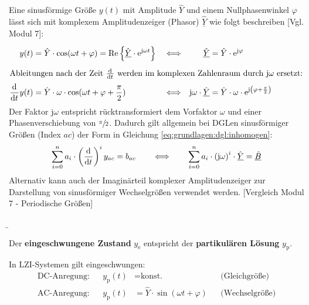 \begin{frame}
{    Eine sinusförmige Größe $y(t)$ mit Amplitude $\hat{Y}$ und einem Nullphasenwinkel $\varphi$ lässt sich mit komplexem Amplitudenzeiger (Phasor) $\underline{\hat{Y}}$ 
    wie folgt beschreiben [Vgl. Modul 7]:
    \begin{align*}
        y(t) &= \hat{Y} \cdot \cos(\omega t + \varphi) = \operatorname{Re}\left\{ \underline{\hat{Y}} \cdot \mathrm{e}^{\mathrm{j} \omega t} \right\} &
            &\Longleftrightarrow& 
            \underline{\hat{Y}} &= \hat{Y} \cdot \mathrm{e}^{\mathrm{j} \varphi} 
            \vphantom{\bigg|}\\
    \intertext{Ableitungen nach der Zeit $\frac{\mathrm{d}^{{}}}{\mathrm{d}t^{{}}}$ werden im komplexen Zahlenraum durch $\mathrm{j} \omega$ ersetzt:}
        \frac{\mathrm{d}^{{}}}{\mathrm{d}t^{{}}} y(t) &= \hat{Y} \cdot \omega \cdot \cos(\omega t + \varphi + \frac{\pi}{2}) &
            &\Longleftrightarrow& 
            \mathrm{j} \omega \cdot  \underline{\hat{Y}} &= \hat{Y} \cdot \omega \cdot \mathrm{e}^{\mathrm{j} \left(\varphi + \frac{\pi}{2}\right)}
    \end{align*}
    Der Faktor $\mathrm{j}\omega$ entspricht rücktransformiert dem Vorfaktor $\omega$ und einer Phasenverschiebung von $\sfrac{\pi}{2}$. 
    Dadurch gilt allgemein bei DGLen sinusförmiger Größen (Index $ac$) der Form in Gleichung \ref{eq:grundlagen:dgl:inhomogen}: 
    \begin{equation}
        \sum_{i=0}^n a_i \cdot \left(\frac{\mathrm{d}^{{}}}{\mathrm{d}t^{{}}}\right)^i y_{ac} = b_{ac}
        \qquad \Longleftrightarrow \qquad 
        \sum_{i=0}^n a_i \cdot \left(\mathrm{j}\omega\right)^i \cdot \underline{\hat{Y}} = \underline{\hat{B}}
        \label{eq:grundlagen:dgl:komplex}
    \end{equation}
    Alternativ kann auch der Imaginärteil komplexer Amplitudenzeiger zur Darstellung von sinusförmiger Wechselgrößen verwendet werden. 
    [Vergleich Modul 7 - Periodische Größen]

}%
\b{%
    Der \textbf{eingeschwungene Zustand} $y_{\mathrm{e}}$ entspricht der \textbf{partikulären Lösung} $y_{\mathrm{p}}$.
    \vspace{2mm}

    In LZI-Systemen gilt eingeschwungen:
    \begin{align*}
        \text{DC-Anregung:} && y_{\mathrm{p}}(t) &= \text{konst.} &&\text{(Gleichgröße)}\\
        \text{AC-Anregung:} && y_{\mathrm{p}}(t) &= \hat{Y} \cdot \sin(\omega t + \varphi) &&\text{(Wechselgröße)}
    \end{align*}

}
\end{frame}
